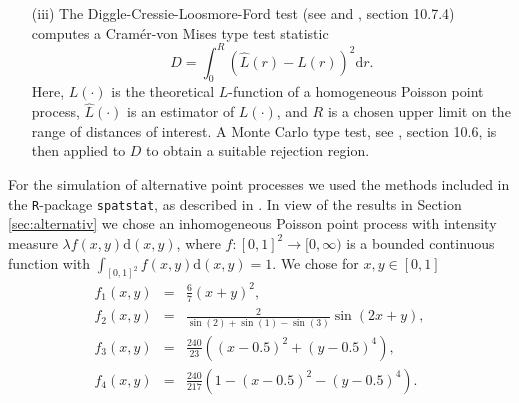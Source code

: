 \documentclass[12pt]{article}
\begin{document}
\begin{itemize}
\item[(iii)] The Diggle-Cressie-Loosmore-Ford test (see \cite{36} and \cite{spatstat}, section 10.7.4) computes a Cram\'er-von Mises type test statistic
    \begin{equation*}
    D=\int_0^R(\widehat{L}(r)-L(r))^2\mbox{d}r.
    \end{equation*}
    Here, $L(\cdot)$ is the theoretical $L$-function of a homogeneous Poisson point process, $\widehat{L}(\cdot)$ is an estimator of $L(\cdot)$,
    and $R$ is a chosen upper limit on the range of distances of interest. A Monte Carlo type test, see \cite{spatstat}, section 10.6, is then applied to $D$ to obtain a suitable rejection region.
\end{itemize}



For the simulation of alternative point processes we used the methods included in the {\tt R}-package {\tt spatstat}, as described in \cite{spatstat}.
In view of the results in Section \ref{sec:alternativ} we chose an inhomogeneous Poisson point process with intensity measure $\lambda f(x,y)\textrm{d}(x,y)$,
where $f:[0,1]^2\rightarrow [0,\infty)$ is a bounded continuous function with $\int_{[0,1]^2}f(x,y) \textrm{d}(x,y)=1$. We chose for $x,y\in[0,1]$
\begin{eqnarray*}
f_1(x,y)&=&\frac67(x+y)^2,\\
f_2(x,y)&=&\frac{2}{\sin(2)+\sin(1)-\sin(3)}\sin(2x+y),\\
f_3(x,y)&=&\frac{240}{23}((x-0.5)^2+(y-0.5)^4),\\
f_4(x,y)&=&\frac{240}{217}(1-(x-0.5)^2-(y-0.5)^4).
\end{eqnarray*}
\end{document}
